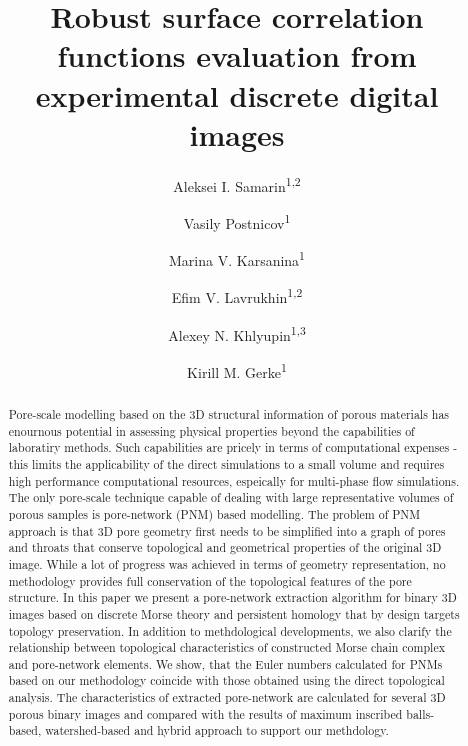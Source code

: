 \documentclass[reprint,amsmath,amssymb,aps,pre,showkeys,showpacs]{revtex4-1}
\begin{document}

\author{Aleksei I. Samarin\textsuperscript{1,2}}
\author{Vasily Postnicov\textsuperscript{1}}
\author{Marina V. Karsanina\textsuperscript{1}}
\author{Efim V. Lavrukhin\textsuperscript{1,2}}
\author{Alexey N. Khlyupin\textsuperscript{1,3}}
\author{Kirill M. Gerke\textsuperscript{1}}


\title{Robust surface correlation functions evaluation from experimental
  discrete digital images}

\begin{abstract}
  Pore-scale modelling based on the 3D structural information of porous
  materials has enournous potential in assessing physical properties beyond the
  capabilities of laboratiry methods. Such capabilities are pricely in terms of
  computational expenses - this limits the applicability of the direct
  simulations to a small volume and requires high performance computational
  resources, espeically for multi-phase flow simulations. The only pore-scale
  technique capable of dealing with large representative volumes of porous
  samples is pore-network (PNM) based modelling. The problem of PNM approach is
  that 3D pore geometry first needs to be simplified into a graph of pores and
  throats that conserve topological and geometrical properties of the original
  3D image. While a lot of progress was achieved in terms of geometry
  representation, no methodology provides full conservation of the topological
  features of the pore structure.  In this paper we present a pore-network
  extraction algorithm for binary 3D images based on discrete Morse theory and
  persistent homology that by design targets topology preservation. In addition
  to methdological developments, we also clarify the relationship between
  topological characteristics of constructed Morse chain complex and
  pore-network elements. We show, that the Euler numbers calculated for PNMs
  based on our methodology coincide with those obtained using the direct
  topological analysis. The characteristics of extracted pore-network are
  calculated for several 3D porous binary images and compared with the results
  of maximum inscribed balls-based, watershed-based and hybrid approach to
  support our methdology.
\end{abstract}
\end{document}
